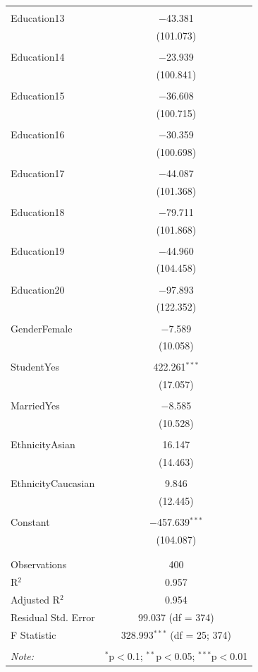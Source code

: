 \documentclass[11pt]{article}
\begin{document}
{\begin{longtable}{@{\extracolsep{5pt}}lc}
  & \\ 
 Education13 & $-$43.381 \\ 
  & (101.073) \\ 
  & \\ 
 Education14 & $-$23.939 \\ 
  & (100.841) \\ 
  & \\ 
 Education15 & $-$36.608 \\ 
  & (100.715) \\ 
  & \\ 
 Education16 & $-$30.359 \\ 
  & (100.698) \\ 
  & \\ 
 Education17 & $-$44.087 \\ 
  & (101.368) \\ 
  & \\ 
 Education18 & $-$79.711 \\ 
  & (101.868) \\ 
  & \\ 
 Education19 & $-$44.960 \\ 
  & (104.458) \\ 
  & \\ 
 Education20 & $-$97.893 \\ 
  & (122.352) \\ 
  & \\ 
 GenderFemale & $-$7.589 \\ 
  & (10.058) \\ 
  & \\ 
 StudentYes & 422.261$^{***}$ \\ 
  & (17.057) \\ 
  & \\ 
 MarriedYes & $-$8.585 \\ 
  & (10.528) \\ 
  & \\ 
 EthnicityAsian & 16.147 \\ 
  & (14.463) \\ 
  & \\ 
 EthnicityCaucasian & 9.846 \\ 
  & (12.445) \\ 
  & \\ 
 Constant & $-$457.639$^{***}$ \\ 
  & (104.087) \\ 
  & \\ 
\hline \\[-1.8ex] 
Observations & 400 \\ 
R$^{2}$ & 0.957 \\ 
Adjusted R$^{2}$ & 0.954 \\ 
Residual Std. Error & 99.037 (df = 374) \\ 
F Statistic & 328.993$^{***}$ (df = 25; 374) \\ 
\hline 
\hline \\[-1.8ex] 
\textit{Note:}  & \multicolumn{1}{r}{$^{*}$p$<$0.1; $^{**}$p$<$0.05; $^{***}$p$<$0.01} \\ 
\end{longtable} 
 

}
\end{document}
